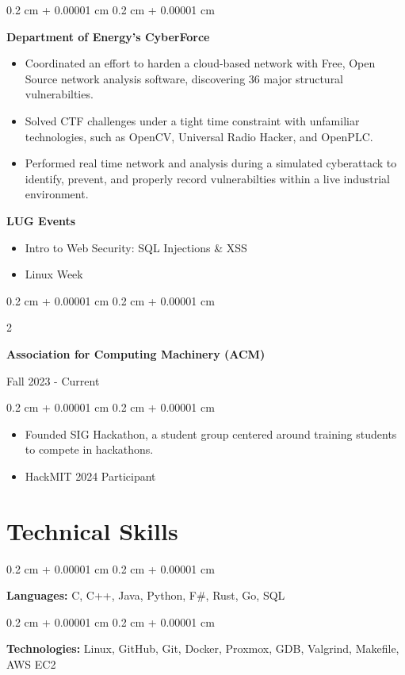 \documentclass[10pt, letterpaper]{article}
\newenvironment{highlights}{
    \begin{itemize}[
        topsep=0.10 cm,
        parsep=0.10 cm,
        partopsep=0pt,
        itemsep=0pt,
        leftmargin=0.4 cm + 10pt
    ]
}{
    \end{itemize}
} %
\newenvironment{onecolentry}{
    \begin{adjustwidth}{
        0.2 cm + 0.00001 cm
    }{
        0.2 cm + 0.00001 cm
    }
}{
    \end{adjustwidth}
} %
\newenvironment{twocolentry}[2][]{
    \onecolentry
    \def\secondColumn{#2}
    \setcolumnwidth{\fill, 4.5 cm}
    \begin{paracol}{2}
}{
    \switchcolumn \raggedleft \secondColumn
    \end{paracol}
    \endonecolentry
} %
\begin{document}
\begin{onecolentry}
	\textbf{Department of Energy's CyberForce}
	\begin{highlights}
    \item Coordinated an effort to harden a cloud-based network with Free, Open Source network analysis software, discovering 36 major structural vulnerabilties. 
    \item Solved CTF challenges under a tight time constraint with unfamiliar technologies, such as OpenCV, Universal Radio Hacker, and OpenPLC.
    \item Performed real time network and analysis during a simulated cyberattack to identify, prevent, and properly record vulnerabilties within a live industrial environment.
	\end{highlights}

  \textbf{LUG Events}
  \begin{itemize}
    \item Intro to Web Security: SQL Injections \& XSS 
    \item Linux Week
  \end{itemize}
\end{onecolentry}

\begin{twocolentry}{

		Fall 2023 - Current}
	\textbf{Association for Computing Machinery (ACM)}
\end{twocolentry}
\begin{onecolentry}
  \begin{highlights}
    \item Founded SIG Hackathon, a student group centered around training students to compete in hackathons.
    \item HackMIT 2024 Participant
  \end{highlights}
\end{onecolentry}

\section{Technical Skills}

\begin{onecolentry}
	\textbf{Languages:} C, C++, Java, Python, F\#, Rust, Go, SQL
\end{onecolentry}

\vspace{0.2 cm}

\begin{onecolentry}
	\textbf{Technologies:} Linux, GitHub, Git, Docker, Proxmox, GDB, Valgrind, Makefile, AWS EC2
\end{onecolentry}

\vspace{0.2 cm}
\end{document}
